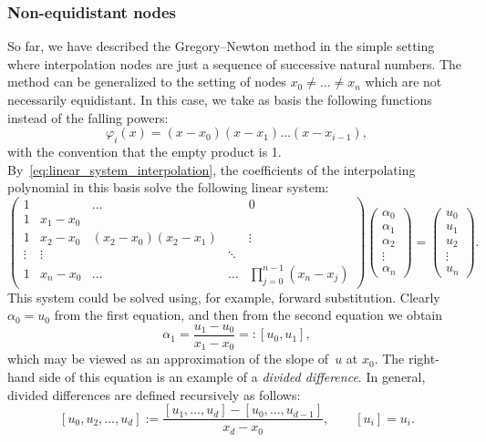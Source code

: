 \subsubsection*{Non-equidistant nodes}%
So far,
we have described the Gregory--Newton method in the simple setting where interpolation nodes are just a sequence of successive natural numbers.
The method can be generalized to the setting of nodes $x_0 \neq \dotsc \neq x_n$ which are not necessarily equidistant.
In this case, we take as basis the following functions instead of the falling powers:
\begin{equation}
    \label{eq:basis_newton}
    \varphi_{i}(x) = (x - x_0) (x - x_1) \dotsc (x - x_{i-1}),
\end{equation}
with the convention that the empty product is 1.
By~\eqref{eq:linear_system_interpolation},
the coefficients of the interpolating polynomial in this basis solve the following linear system:
\begin{equation}
    \label{eq:matrix_newton}
    \begin{pmatrix}
        1 &         & \ldots &        & 0  \\
        1 & x_1-x_0 &        &        &    \\
        1 & x_2-x_0 & (x_2-x_0)(x_2-x_1) &        & \vdots   \\
        \vdots & \vdots  &        & \ddots &    \\
        1 & x_n-x_0 & \ldots & \ldots & \prod_{j=0}^{n-1}(x_n - x_j)
    \end{pmatrix}
    \begin{pmatrix}
        \alpha_0 \\
        \alpha_1 \\
        \alpha_2 \\
        \vdots \\
        \alpha_n
    \end{pmatrix}
    =
    \begin{pmatrix}
        u_0 \\
        u_1 \\
        u_2 \\
        \vdots \\
        u_n
    \end{pmatrix}.
\end{equation}
This system could be solved using, for example, forward substitution.
Clearly $\alpha_0 = u_0$ from the first equation,
and then from the second equation we obtain
\[
    \alpha_1 = \frac{u_1 - u_0}{x_1 - x_0} =: [u_0, u_1],
\]
which may be viewed as an approximation of the slope of~$u$ at $x_0$.
The right-hand side of this equation is an example of a \emph{divided difference}.
In general, divided differences are defined recursively as follows:
\begin{equation}
    \label{eq:definition_divided_difference}
    [u_{0}, u_{2}, \dotsc, u_{d}] := \frac{[u_{1}, \dotsc, u_{d}] - [u_{0}, \dotsc, u_{d-1}]}{x_{d}-x_{0}}, \qquad [u_i] = u_i.
\end{equation}

